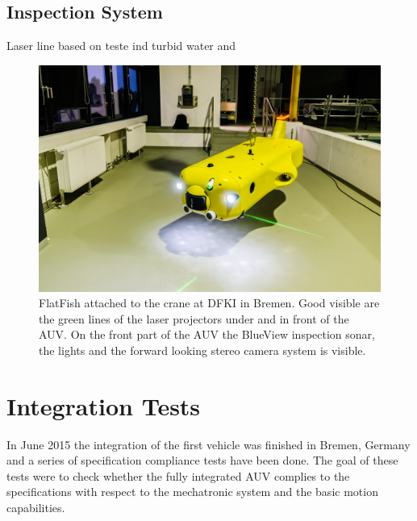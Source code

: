 \documentclass[conference]{IEEEtran}
\begin{document}
\subsection{Inspection System}

Laser line based on \cite{duda2013} teste ind turbid water \cite{albiez2015} and \cite{mcleod2013}

\begin{figure}[!t]
	\centering
	\includegraphics[width=0.9\columnwidth]{FlatFish-3.jpg}
	\caption{FlatFish attached to the crane at DFKI in Bremen. Good visible are the green lines of the laser projectors under and in front of the AUV. On the front part of the AUV the BlueView inspection sonar, the lights and the forward looking stereo camera system is visible.}
	\label{fig:flatfishlaser}
\end{figure}


\section{Integration Tests}

In June 2015 the integration of the first vehicle was finished in Bremen, Germany and a series of specification compliance tests have been done. The goal of these tests were to check whether the fully integrated AUV complies to the specifications with respect to the mechatronic system and the basic motion capabilities. 
\end{document}

